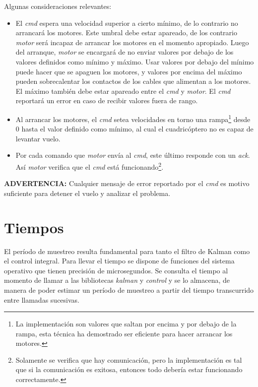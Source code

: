 \documentclass[main]{subfiles}
\begin{document}
Algunas consideraciones relevantes:
\begin{itemize}
\item El \textit{cmd} espera una velocidad superior a cierto m\'inimo, de lo contrario no arrancar\'a los motores. Este umbral debe estar apareado, de los contrario \textit{motor} ser\'a incapaz de arrancar los motores en el momento apropiado.\newline
Luego del arranque, \textit{motor} se encargar\'a de no enviar valores por debajo de los valores definidos como m\'inimo y m\'aximo. Usar valores por debajo del m\'inimo puede hacer que se apaguen los motores, y valores por encima del m\'aximo pueden sobrecalentar los contactos de los cables que alimentan a los motores. El m\'aximo tambi\'en debe estar apareado entre el \textit{cmd} y \textit{motor}.\newline
El \textit{cmd} reportar\'a un error en caso de recibir valores fuera de rango.

\item Al arrancar los motores, el \textit{cmd} setea velocidades en torno una rampa\footnote{La implementaci\'on son valores que saltan por encima y por debajo de la rampa, esta t\'ecnica ha demostrado ser eficiente para hacer arrancar los motores.} desde 0 hasta el valor definido como m\'inimo, al cual el cuadric\'optero no es capaz de levantar vuelo.

\item Por cada comando que \textit{motor} env\'ia al \textit{cmd}, este \'ultimo responde con un \textit{ack}. Así \textit{motor} verifica que el \textit{cmd} est\'a funcionando\footnote{Solamente se verifica que hay comunicaci\'on, pero la implementaci\'on es tal que si la comunicaci\'on es exitosa, entonces todo deber\'ia estar funcionando correctamente.}.

\end{itemize}

\textbf{ADVERTENCIA:} Cualquier mensaje de error reportado por el \textit{cmd} es motivo suficiente para detener el vuelo y analizar el problema.

\section{Tiempos}
\label{sec:software:tiempos}

El per\'iodo de muestreo resulta fundamental para tanto el filtro de Kalman como el control integral. Para llevar el tiempo se dispone de funciones del sistema operativo que tienen precisi\'on de microsegundos. Se consulta el tiempo al momento de llamar a las bibliotecas \textit{kalman} y \textit{control} y se lo almacena, de manera de poder estimar un per\'iodo de muestreo a partir del tiempo transcurrido entre llamadas sucesivas.
\end{document}
